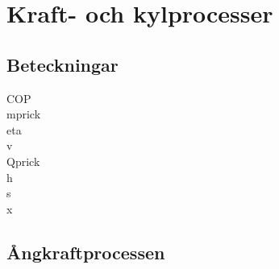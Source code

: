 \chapter{Kraft- och kylprocesser}
\section*{Beteckningar}
\acrfull{COP}\\
\acrfull{mprick}\\
\acrfull{eta}\\
\acrfull{v}\\
\acrfull{Qprick}\\
\acrfull{h}\\
\acrfull{s}\\
\acrfull{x} \par
\section*{Ångkraftprocessen}
